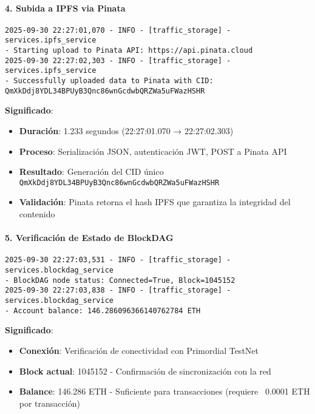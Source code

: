 \documentclass[onecolumn]{article}
\begin{document}
\paragraph{4. Subida a IPFS via Pinata}
\begin{verbatim}
2025-09-30 22:27:01,070 - INFO - [traffic_storage] - services.ipfs_service 
- Starting upload to Pinata API: https://api.pinata.cloud
2025-09-30 22:27:02,303 - INFO - [traffic_storage] - services.ipfs_service 
- Successfully uploaded data to Pinata with CID: QmXkDdj8YDL34BPUyB3Qnc86wnGcdwbQRZWa5uFWazHSHR
\end{verbatim}
\textbf{Significado}: 
\begin{itemize}
    \item \textbf{Duración}: 1.233 segundos (22:27:01.070 → 22:27:02.303)
    \item \textbf{Proceso}: Serialización JSON, autenticación JWT, POST a Pinata API
    \item \textbf{Resultado}: Generación del CID único \texttt{QmXkDdj8YDL34BPUyB3Qnc86wnGcdwbQRZWa5uFWazHSHR}
    \item \textbf{Validación}: Pinata retorna el hash IPFS que garantiza la integridad del contenido
\end{itemize}

\paragraph{5. Verificación de Estado de BlockDAG}
\begin{verbatim}
2025-09-30 22:27:03,531 - INFO - [traffic_storage] - services.blockdag_service 
- BlockDAG node status: Connected=True, Block=1045152
2025-09-30 22:27:03,838 - INFO - [traffic_storage] - services.blockdag_service 
- Account balance: 146.286096366140762784 ETH
\end{verbatim}
\textbf{Significado}:
\begin{itemize}
    \item \textbf{Conexión}: Verificación de conectividad con Primordial TestNet
    \item \textbf{Block actual}: 1045152 - Confirmación de sincronización con la red
    \item \textbf{Balance}: 146.286 ETH - Suficiente para transacciones (requiere ~0.0001 ETH por transacción)
\end{itemize}
\end{document}
